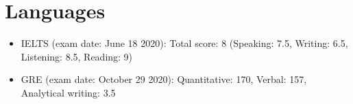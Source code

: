 \documentclass[11pt, a4paper]{moderncv}
\begin{document}
\section{Languages}
{
	\begin{itemize}
	\item IELTS (exam date: June 18 2020): Total score: 8 (Speaking: 7.5, Writing: 6.5, Listening: 8.5, Reading: 9)
	\item GRE (exam date: October 29 2020):  Quantitative: 170, Verbal: 157, Analytical writing: 3.5
	\end{itemize}
}


\iffalse

\section{Hobbies and Activities}

\cvitem{Playing the piano}{
\begin{itemize}
\item Finalist in National Barbad festival, 2018
\item Finalist in National Youth music festival, 2018
\item Ranked second in Hamsaz music festival, 2014
\item Ranked first in Tehran cultural center's piano competition, 2010
\item Ranked second in Tehran cultural center's piano competition, 2009
\end{itemize}
}
\cvitem{Other activities}{Playing soccer, Playing chess}

\fi

\end{document}
